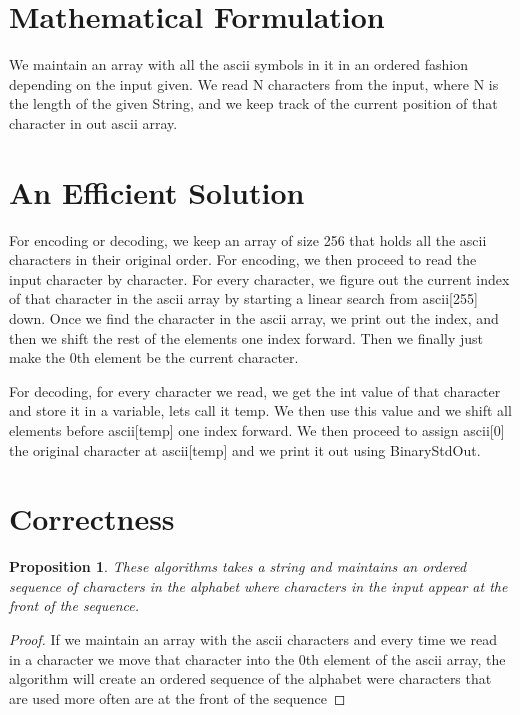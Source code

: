 \documentclass[12pt]{article}
\newtheorem{proposition}[theorem]{Proposition}
\begin{document}
\section{Mathematical Formulation}
We maintain an array with all the ascii symbols in it in an ordered fashion depending on the input given. We read N characters from the input, where N is the length of the given String, and we keep track of the current position of that character in out ascii array.

\section{An Efficient Solution}
For encoding or decoding, we keep an array of size 256 that holds all the ascii characters in their original order. For encoding, we then proceed to read the input character by character. For every character, we figure out the current index of that character in the ascii array by starting a linear search from ascii[255] down. Once we find the character in the ascii array, we print out the index, and then we shift the rest of the elements one index forward. Then we finally just make the 0th element be the current character.

For decoding, for every character we read, we get the int value of that character and store it in a variable, lets call it temp. We then use this value and we shift all elements before ascii[temp] one index forward. We then proceed to assign ascii[0] the original character at ascii[temp] and we print it out using BinaryStdOut.

\section{Correctness}

\begin{proposition}
These algorithms takes a string and maintains an ordered sequence of characters in the alphabet where characters in the input appear at the front of the sequence.
\end{proposition}

\begin{proof}
If we maintain an array with the ascii characters and every time we read in a character we move that character into the 0th element of the ascii array, the algorithm will create an ordered sequence of the alphabet were characters that are used more often are at the front of the sequence
\end{proof}
\end{document}
